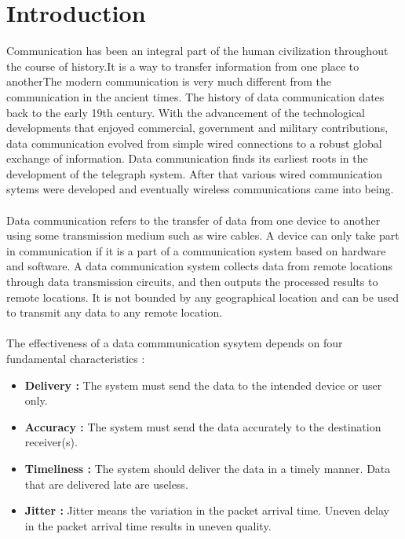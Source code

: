 \documentclass[12pt,a4paper]{article}%
\begin{document}
	\section{Introduction}
	\begin{flushleft}
		Communication has been an integral part of the human civilization throughout the course of history.It is a way to transfer information from one place to anotherThe modern communication is very much different from 
		the communication in the ancient times.
		The history of data communication dates back to the early 19th century. With the advancement of the technological developments that enjoyed commercial, government and military contributions, data communication
		evolved from simple wired connections to a robust global exchange of information. Data communication finds its earliest roots in the development of the telegraph system. After that various wired communication sytems were
		developed and eventually wireless communications came into being.
		\paragraph{}
		Data communication refers to the transfer of data from one device to another using some transmission medium such as wire cables. A device can only take part in communication if it is a part of a communication system based 
		on hardware and software. A data communication system collects data from remote locations through data transmission circuits, and then outputs the processed results to remote locations. It is not bounded by any geographical 
		location and can be used to transmit any data to any remote location.
		\paragraph{}
		The effectiveness of a data commmunication sysytem depends on four fundamental characteristics :
		\begin{itemize}
			\item \textbf{Delivery : } The system must send the data to the intended device or user only.
			\item \textbf{Accuracy : } The system must send the data accurately to the destination receiver(s). 
			\item \textbf{Timeliness : } The system should deliver the data in a timely manner. Data that are delivered late are useless.
			\item \textbf{Jitter : } Jitter means the variation in the packet arrival time. Uneven delay in the packet arrival time results in uneven quality.
		\end{itemize}

\end{flushleft}
\end{document}
